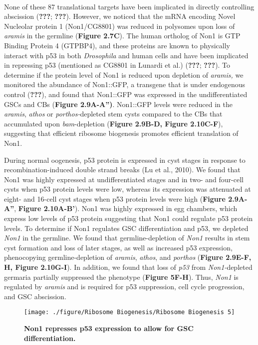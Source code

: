 \documentclass[12pt,oneside]{reedthesis}
\begin{document}

\textbf{\\
}

None of these 87 translational targets have been implicated in directly controlling abscission ({\textbf{???}}; {\textbf{???}}). However, we noticed that the mRNA encoding Novel Nucleolar protein 1 (Non1/CG8801) was reduced in polysomes upon loss of \emph{aramis} in the germline (\textbf{Figure 2.7C}). The human ortholog of Non1 is GTP Binding Protein 4 (GTPBP4), and these proteins are known to physically interact with p53 in both \emph{Drosophila} and human cells and have been implicated in repressing p53 (mentioned as CG8801 in Lunardi et al.) ({\textbf{???}}; {\textbf{???}}). To determine if the protein level of Non1 is reduced upon depletion of \emph{aramis,} we monitored the abundance of Non1::GFP, a transgene that is under endogenous control ({\textbf{???}}), and found that Non1::GFP was expressed in the undifferentiated GSCs and CBs (\textbf{Figure 2.9A-A'')}. Non1::GFP levels were reduced in the \emph{aramis}, \emph{athos} or \emph{porthos-}depleted stem cysts compared to the CBs that accumulated upon \emph{bam}-depletion (\textbf{Figure 2.9B-D, Figure 2.10C-F}), suggesting that efficient ribosome biogenesis promotes efficient translation of Non1.

During normal oogenesis, p53 protein is expressed in cyst stages in response to recombination-induced double strand breaks (Lu et al., 2010). We found that Non1 was highly expressed at undifferentiated stages and in two- and four-cell cysts when p53 protein levels were low, whereas its expression was attenuated at eight- and 16-cell cyst stages when p53 protein levels were high (\textbf{Figure 2.9A-A''}, \textbf{Figure 2.10A-B'}). Non1 was highly expressed in egg chambers, which express low levels of p53 protein suggesting that Non1 could regulate p53 protein levels. To determine if Non1 regulates GSC differentiation and p53, we depleted \emph{Non1} in the germline. We found that germline-depletion of \emph{Non1} results in stem cyst formation and loss of later stages, as well as increased p53 expression, phenocopying germline-depletion of \emph{aramis}, \emph{athos}, and \emph{porthos} (\textbf{Figure 2.9E-F, H, Figure 2.10G-I}). In addition, we found that loss of \emph{p53} from \emph{Non1-}depleted germaria partially suppressed the phenotype (\textbf{Figure 5F-H}). Thus, \emph{Non1} is regulated by \emph{aramis} and is required for p53 suppression, cell cycle progression, and GSC abscission.
\begin{figure}

{\centering \texttt{[image: ./figure/Ribosome Biogenesis/Ribosome Biogenesis 5]} 

}

\caption[\textbf{Non1 represses p53 expression to allow for GSC differentiation.}]{\textbf{Non1 represses p53 expression to allow for GSC differentiation.}}\label{fig:unnamed-chunk-14}
\end{figure}
\end{document}
